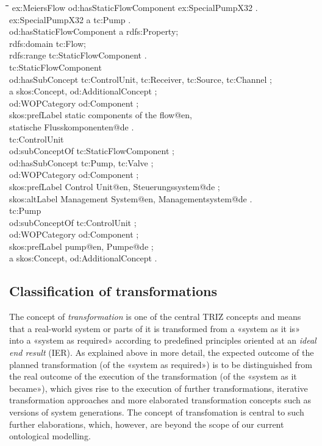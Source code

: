 \documentclass[11pt,a4paper]{article}
\newenvironment{code}{\tt \begin{tabbing}
\hskip12pt\=\hskip12pt\=\hskip12pt\=\hskip12pt\=\hskip5cm\=\hskip5cm\=\kill}
{\end{tabbing}}
\def\dq{{\char34}}
\begin{document}
\begin{code}
  ex:MeiersFlow od:hasStaticFlowComponent ex:SpecialPumpX32 . \\
  ex:SpecialPumpX32 a tc:Pump . \\[4pt]
  
od:hasStaticFlowComponent a rdfs:Property;\\
    \>rdfs:domain tc:Flow;\\
    \>rdfs:range tc:StaticFlowComponent .\\[4pt]
  
tc:StaticFlowComponent\\
    \>od:hasSubConcept tc:ControlUnit, tc:Receiver, tc:Source, tc:Channel ;\\
    \>a skos:Concept, od:AdditionalConcept ;\\
  \>od:WOPCategory od:Component ;\\
    \>skos:prefLabel {\dq}static components of the flow{\dq}@en,\\
    \>\>{\dq}statische Flusskomponenten{\dq}@de .\\[4pt]

tc:ControlUnit\\
    \>od:subConceptOf tc:StaticFlowComponent ;\\
    \>od:hasSubConcept tc:Pump, tc:Valve ;\\
  \>od:WOPCategory od:Component ;\\
    \>skos:prefLabel {\dq}Control Unit{\dq}@en, {\dq}Steuerungssystem{\dq}@de
    ;\\ 
    \>skos:altLabel {\dq}Management System{\dq}@en,
          {\dq}Managementsystem{\dq}@de .\\[4pt] 

tc:Pump\\
    \>od:subConceptOf tc:ControlUnit ;\\
  \>od:WOPCategory od:Component ;\\
    \>skos:prefLabel {\dq}pump{\dq}@en, {\dq}Pumpe{\dq}@de ;\\
    \>a skos:Concept, od:AdditionalConcept .
\end{code}

\subsection{Classification of transformations}

The concept of \emph{transformation} is one of the central TRIZ concepts and
means that a real-world system or parts of it is transformed from a «system as
it is» into a «system as required» according to predefined principles oriented
at an \emph{ideal end result} (IER). As explained above in more detail, the
expected outcome of the planned transformation (of the «system as required»)
is to be distinguished from the real outcome of the execution of the
transformation (of the «system as it became»), which gives rise to the
execution of further transformations, iterative transformation approaches and
more elaborated transformation concepts such as versions of system
generations.  The concept of transfomation is central to such further
elaborations, which, however, are beyond the scope of our current ontological
modelling.
\end{document}
